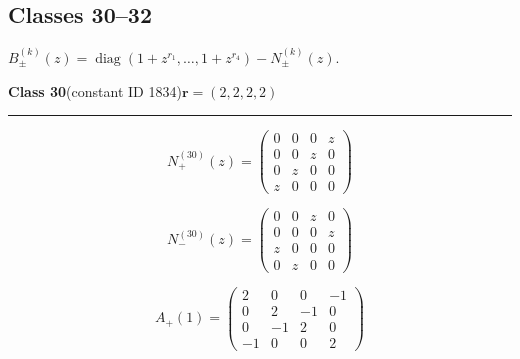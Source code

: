 \subsection*{Classes 30--32}
\noindent $B_\pm^{(k)}(z)=\operatorname{diag}(1+z^{r_1},\ldots,1+z^{r_4})-N_\pm^{(k)}(z)$.\par\medskip
\noindent\begin{minipage}{\linewidth}
\noindent\textbf{Class 30}\quad\small (constant ID 1834)\hfill $\symbf{r}=(2,2,2,2)$
\par\smallskip\noindent\textcolor{rulegray}{\rule{\linewidth}{0.3pt}}
\begin{minipage}[c]{0.495\linewidth}\centering\fontsize{9.7}{12}\selectfont
\setlength{\abovedisplayskip}{4pt}\setlength{\belowdisplayskip}{4pt}
\setlength{\abovedisplayshortskip}{4pt}\setlength{\belowdisplayshortskip}{4pt}
\setlength{\arraycolsep}{3pt}\renewcommand{\arraystretch}{1.08}
\[N_{+}^{(30)}(z)=\begin{pmatrix}0 & 0 & 0 & z\\0 & 0 & z & 0\\0 & z & 0 & 0\\z & 0 & 0 & 0\end{pmatrix}\]
\end{minipage}%
\begin{minipage}[c]{0.495\linewidth}\centering\fontsize{9.7}{12}\selectfont
\setlength{\abovedisplayskip}{4pt}\setlength{\belowdisplayskip}{4pt}
\setlength{\abovedisplayshortskip}{4pt}\setlength{\belowdisplayshortskip}{4pt}
\setlength{\arraycolsep}{3pt}\renewcommand{\arraystretch}{1.08}
\[N_{-}^{(30)}(z)=\begin{pmatrix}0 & 0 & z & 0\\0 & 0 & 0 & z\\z & 0 & 0 & 0\\0 & z & 0 & 0\end{pmatrix}\]
\end{minipage}%
\par\noindent
\begin{minipage}[c]{0.495\linewidth}\centering\fontsize{9.7}{12}\selectfont
\setlength{\abovedisplayskip}{4pt}\setlength{\belowdisplayskip}{4pt}
\setlength{\abovedisplayshortskip}{4pt}\setlength{\belowdisplayshortskip}{4pt}
\setlength{\arraycolsep}{3pt}\renewcommand{\arraystretch}{1.08}
\[A_{+}(1)=\begin{pmatrix}2 & 0 & 0 & -1\\0 & 2 & -1 & 0\\0 & -1 & 2 & 0\\-1 & 0 & 0 & 2\end{pmatrix}\]

\end{minipage}
\end{minipage}
